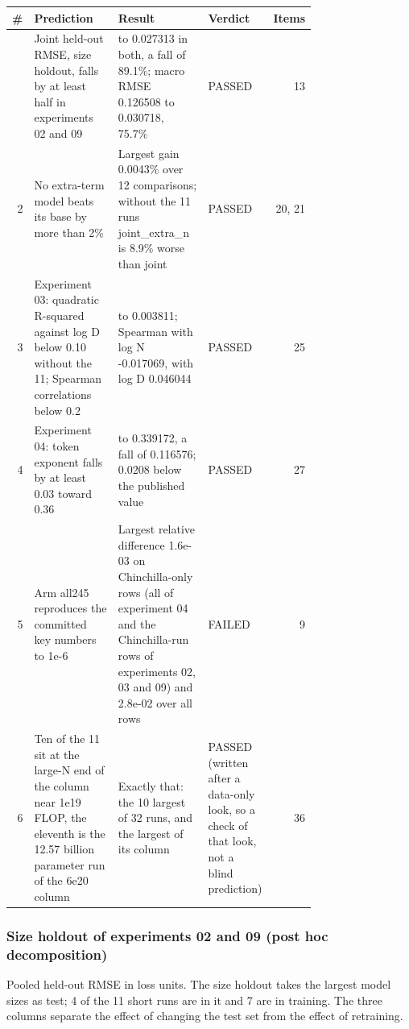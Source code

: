 {\footnotesize
\begin{longtable}{r>{\raggedright\arraybackslash}p{0.329\linewidth}>{\raggedright\arraybackslash}p{0.329\linewidth}>{\raggedright\arraybackslash}p{0.092\linewidth}r}
\toprule
\textbf{\#} & \textbf{Prediction} & \textbf{Result} & \textbf{Verdict} & \textbf{Items} \\
\midrule
\endhead
\bottomrule
\endfoot
1 & Joint held-out RMSE, size holdout, falls by at least half in experiments 02 and 09 & 0.250103 to 0.027313 in both, a fall of 89.1\%; macro RMSE 0.126508 to 0.030718, 75.7\% & PASSED & 13 \\
2 & No extra-term model beats its base by more than 2\% & Largest gain 0.0043\% over 12 comparisons; without the 11 runs joint\_extra\_n is 8.9\% worse than joint & PASSED & 20, 21 \\
3 & Experiment 03: quadratic R-squared against log D below 0.10 without the 11; Spearman correlations below 0.2 & 0.320319 to 0.003811; Spearman with log N -0.017069, with log D 0.046044 & PASSED & 25 \\
4 & Experiment 04: token exponent falls by at least 0.03 toward 0.36 & 0.455748 to 0.339172, a fall of 0.116576; 0.0208 below the published value & PASSED & 27 \\
5 & Arm all245 reproduces the committed key numbers to 1e-6 & Largest relative difference 1.6e-03 on Chinchilla-only rows (all of experiment 04 and the Chinchilla-run rows of experiments 02, 03 and 09) and 2.8e-02 over all rows & FAILED & 9 \\
6 & Ten of the 11 sit at the large-N end of the column near 1e19 FLOP, the eleventh is the 12.57 billion parameter run of the 6e20 column & Exactly that: the 10 largest of 32 runs, and the largest of its column & PASSED (written after a data-only look, so a check of that look, not a blind prediction) & 36 \\
\end{longtable}
}

\subsubsection*{Size holdout of experiments 02 and 09 (post hoc decomposition)}

Pooled held-out RMSE in loss units. The size holdout takes the largest model sizes as test; 4 of the 11 short runs are in it and 7 are in training. The three columns separate the effect of changing the test set from the effect of retraining.


